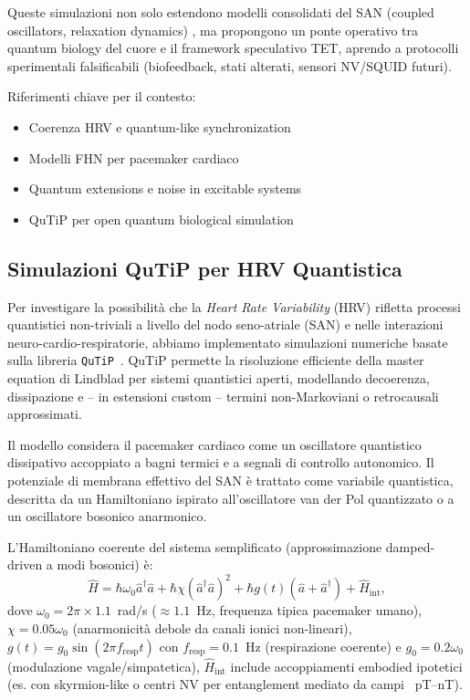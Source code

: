 \documentclass[11pt,a4paper]{article}
\let\oldcite\cite
\renewcommand{\cite}{\protect\oldcite}
\theoremstyle{plain}
\theoremstyle{definition}
\begin{document}
Queste simulazioni non solo estendono modelli consolidati del SAN (coupled oscillators, relaxation dynamics) \cite{Gratz2018}, ma propongono un ponte operativo tra quantum biology del cuore \cite{McCratyVarious} e il framework speculativo TET, aprendo a protocolli sperimentali falsificabili (biofeedback, stati alterati, sensori NV/SQUID futuri).

Riferimenti chiave per il contesto:
\begin{itemize}
    \item Coerenza HRV e quantum-like synchronization \cite{McCraty2017,McCraty1996}
    \item Modelli FHN per pacemaker cardiaco \cite{FitzHugh1961,Nagumo1962}
    \item Quantum extensions e noise in excitable systems \cite{Ghose2025}
    \item QuTiP per open quantum biological simulation \cite{Johansson2012qutip}
\end{itemize}


\subsection{Simulazioni QuTiP per HRV Quantistica}

Per investigare la possibilità che la \textit{Heart Rate Variability} (HRV) rifletta processi quantistici non-triviali a livello del nodo seno-atriale (SAN) e nelle interazioni neuro-cardio-respiratorie, abbiamo implementato simulazioni numeriche basate sulla libreria \texttt{QuTiP}~\cite{Johansson2012qutip,Johansson2013qutip}. QuTiP permette la risoluzione efficiente della master equation di Lindblad per sistemi quantistici aperti, modellando decoerenza, dissipazione e -- in estensioni custom -- termini non-Markoviani o retrocausali approssimati.

\vspace{0.2cm}

Il modello considera il pacemaker cardiaco come un oscillatore quantistico dissipativo accoppiato a bagni termici e a segnali di controllo autonomico. Il potenziale di membrana effettivo del SAN è trattato come variabile quantistica, descritta da un Hamiltoniano ispirato all'oscillatore van der Pol quantizzato o a un oscillatore bosonico anarmonico.

L'Hamiltoniano coerente del sistema semplificato (approssimazione damped-driven a modi bosonici) è:
\begin{equation}
\hat{H} = \hbar \omega_0 \hat{a}^\dagger \hat{a} + \hbar \chi (\hat{a}^\dagger \hat{a})^2 + \hbar g(t) (\hat{a} + \hat{a}^\dagger) + \hat{H}_\text{int},
\label{eq:H_coherent}
\end{equation}
dove $\omega_0 = 2\pi \times 1.1$~rad/s ($\approx 1.1$~Hz, frequenza tipica pacemaker umano), $\chi = 0.05 \omega_0$ (anarmonicità debole da canali ionici non-lineari), $g(t) = g_0 \sin(2\pi f_\text{resp} t)$ con $f_\text{resp} = 0.1$~Hz (respirazione coerente) e $g_0 = 0.2 \omega_0$ (modulazione vagale/simpatetica), $\hat{H}_\text{int}$ include accoppiamenti embodied ipotetici (es. con skyrmion-like o centri NV per entanglement mediato da campi ~pT–nT).
\end{document}
